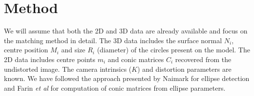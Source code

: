 \documentclass{bmvc2k}
\def\etal{\emph{et al}\bmvaOneDot}
\begin{document}
\section{Method}
We will assume that both the 2D and 3D data are already available and focus on the matching method in detail. 
The 3D data includes the surface normal $N_i$, centre position $M_i$ and size $R_i$ (diameter) of the circles present on the model. 
The 2D data includes centre points $m_i$ and conic matrices $C_i$ recovered from the undistorted image. The camera intrinsics ($K$) and distortion parameters are known. 
We have followed the approach presented by Naimark \cite{naimark_circular_2002} for ellipse detection and Farin \etal \cite{farin_geometry_1998} for computation of conic matrices from ellipse parameters. 
\end{document}

